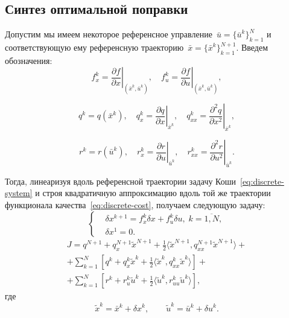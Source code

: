 \documentclass[../../doc.tex]{subfiles}
\begin{document}
    \subsection{Синтез оптимальной поправки}
    
    Допустим мы имеем некоторое референсное управление~$\bar u=\{\bar u^k\}_{k=1}^{N}$ и соответствующую ему референсную траекторию~$\bar x=\{\bar x^k\}_{k=1}^{N+1}$.
    Введем обозначения:
    $$
        f_x^k = \left.\frac{\partial f}{\partial x}\right|_{(\bar x^k, \bar u^k)},
        \quad
        f_u^k = \left.\frac{\partial f}{\partial u}\right|_{(\bar x^k, \bar u^k)},
    $$

    $$
        q^k = q(\bar x^k),
        \quad
        q_x^k = \left.\frac{\partial q}{\partial x}\right|_{\bar x^k},
        \quad
        q_{xx}^k = \left.\frac{\partial^2 q}{\partial x^2}\right|_{\bar x^k},
    $$

    $$
        r^k = r(\bar u^k),
        \quad
        r_x^k = \left.\frac{\partial r}{\partial u}\right|_{\bar u^k},
        \quad
        r_{xx}^k = \left.\frac{\partial^2 r}{\partial u^2}\right|_{\bar u^k}.
    $$

    Тогда, линеаризуя вдоль референсной траектории задачу Коши~\eqref{eq:discrete-system} и строя квадратичную аппроксимацию вдоль той же траектории функционала качества~\eqref{eq:discrete-cost}, получаем следующую задачу:
    \begin{equation}\label{eq:ref-system}
        \left\{\begin{aligned}
            &\delta x^{k+1} = f_x^k \delta x + f_u^k \delta u, \; k=\overline{1,N}, \\
            &\delta x^1 = 0.
        \end{aligned}\right.
    \end{equation}
    \begin{multline}\label{eq:ref-cost}
        J = q^{N+1} + q_x^{N+1}\tilde x^{N+1} + \frac{1}{2}\langle \tilde x^{N+1}, q_{xx}^{N+1}\tilde x^{N+1} \rangle
        + \\ +
        \sum_{k=1}^{N}\left[ q^{k} + q_x^{k}\tilde x^{k} + \frac{1}{2}\langle \tilde x^{k}, q_{xx}^{k}\tilde x^{k} \rangle \right]
        + \\ +
        \sum_{k=1}^{N}\left[ r^{k} + r_u^{k}\tilde u^{k} + \frac{1}{2}\langle \tilde u^{k}, r_{uu}^{k}\tilde u^{k} \rangle \right],
    \end{multline}
    где
    \begin{equation*}
        \tilde x^k = \bar x^k + \delta x^k, \qquad \tilde u^k = \bar u^k + \delta u^k.
    \end{equation*}
\end{document}
